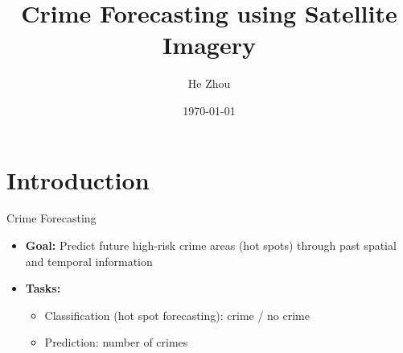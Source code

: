\documentclass[10pt]{beamer}
\title[\textcolor{white}{Crime Forecasting}]{Crime Forecasting using Satellite Imagery}
\author{He Zhou}
\institute[UMN] 
{University of Minnesota, 3rd Stats PhD}
\date{\today}
\begin{document}
\begin{frame}

\end{frame}

\begin{frame}[plain]
\titlepage 
\end{frame}





\section{Introduction}

\begin{frame}{Crime Forecasting}
\begin{itemize}
    \item \textbf{Goal:} Predict future high-risk crime areas (hot spots) through past spatial and temporal information
    \item \textbf{Tasks:}
    \begin{itemize}
        \item Classification (hot spot forecasting): crime / no crime
        \item Prediction: number of crimes
    \end{itemize}
\end{itemize}
\end{frame}
\end{document}
